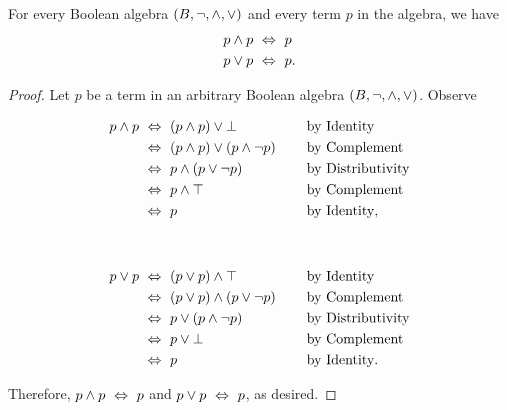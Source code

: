 \begin{theorem}[Idempotency]
    For every Boolean algebra $(B, \neg, \wedge, \vee)$ and every term $p$ in the algebra,
    we have
    \begin{align*}
        p \wedge p &~\Leftrightarrow~ p\\
        p \vee p &~\Leftrightarrow~ p.
    \end{align*}
\end{theorem}
\begin{proof}
    Let $p$ be a term in an arbitrary Boolean algebra $(B, \neg, \wedge, \vee)$.
    Observe
    \begin{center}
        \begin{minipage}{.45\linewidth}
            \begin{alignat*}{2}
                p \wedge p &~\Leftrightarrow~ (p \wedge p) \vee \bot~~~~~~~~~~~~&&\text{by Identity}\\
                          &~\Leftrightarrow~ (p \wedge p) \vee (p \wedge \neg p) &&\text{by Complement}\\
                          &~\Leftrightarrow~ p \wedge (p \vee \neg p) &&\text{by Distributivity}\\
                          &~\Leftrightarrow~ p \wedge \top &&\text{by Complement}\\
                          &~\Leftrightarrow~ p &&\text{by Identity},
            \end{alignat*}
        \end{minipage}%
        \begin{minipage}{.1\linewidth}
            ~
        \end{minipage}%
        \begin{minipage}{.45\linewidth}
            \begin{alignat*}{2}
                p \vee p &~\Leftrightarrow~ (p \vee p) \wedge \top~~~~~~~~~~~~&&\text{by Identity}\\
                          &~\Leftrightarrow~ (p \vee p) \wedge (p \vee \neg p) &&\text{by Complement}\\
                          &~\Leftrightarrow~ p \vee (p \wedge \neg p) &&\text{by Distributivity}\\
                          &~\Leftrightarrow~ p \vee \bot &&\text{by Complement}\\
                          &~\Leftrightarrow~ p &&\text{by Identity}.
            \end{alignat*}
        \end{minipage}
    \end{center}
    Therefore, $p \wedge p ~\Leftrightarrow~ p$ and $p \vee p ~\Leftrightarrow~ p$, as desired.
\end{proof}

